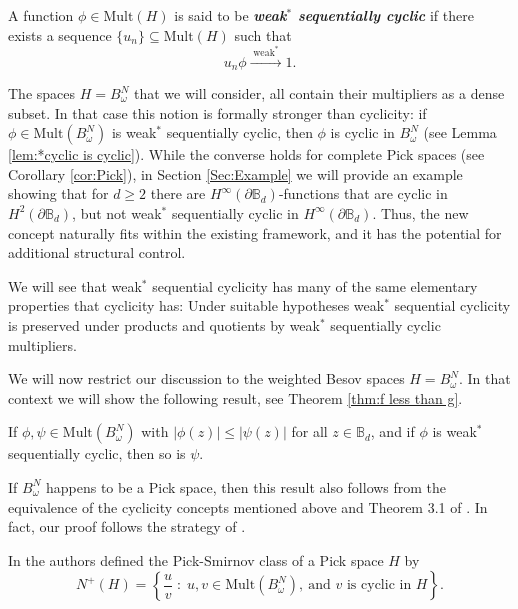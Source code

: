 \documentclass{article}
\numberwithin{equation}{section}
\newcommand{\dB}{\partial \mathbb B_d}
\newcommand{\Bd}{\mathbb B_d}
\begin{document}
\begin{defn}
A function $\phi \in \mathrm{Mult}(H)$ is said to be 
\textbf{\emph{weak$^\ast$ sequentially cyclic}} if there exists a sequence 
$\{u_n\} \subseteq  \mathrm{Mult}(H)$ such that
\[
u_n\phi \xrightarrow{\;\mathrm{weak}^\ast\;} 1.
\]
\end{defn}

The spaces $H=B^N_\omega$ that we will consider, all contain their multipliers as a dense subset. In that case this notion is formally stronger than  cyclicity: if $\phi \in \mathrm{Mult}(B^{N}_{\omega})$ is 
weak$^\ast$ sequentially cyclic, then $\phi$ is cyclic in 
$B^{N}_{\omega}$ (see Lemma \ref{lem:*cyclic is cyclic}). While the converse holds for complete Pick spaces (see Corollary \ref{cor:Pick}), 
in Section \ref{Sec:Example} we will provide an 
 example  showing that for $d\ge 2$ there are $H^\infty(\dB)$-functions that are cyclic in $H^2(\dB)$, but 
not  weak$^\ast$ sequentially cyclic in $H^\infty(\dB)$. Thus, the new concept naturally fits within the existing 
framework, and it has the potential for additional structural control.

We will see that weak$^\ast$ sequential cyclicity has many of the same elementary properties that cyclicity has: Under suitable 
hypotheses weak$^\ast$ sequential cyclicity is preserved under 
products and quotients by weak$^\ast$ sequentially cyclic multipliers.  

We will now restrict our discussion to the weighted Besov spaces  $H=B^N_\omega$. In that context  we will show the following result, see Theorem \ref{thm:f less than g}. 

\begin{thm} If $\phi, \psi \in \mathrm{Mult}(B^N_\omega)$ with $|\phi(z)|\le |\psi(z)|$ for all $z\in \Bd$, and if $\phi$ is weak$^\ast$ sequentially cyclic, then so is $\psi$.\end{thm} 
If $ B^N_\omega$ happens to be a Pick space, then this result also follows from the equivalence of the cyclicity concepts mentioned above and Theorem 3.1 of \cite{AlemanPerfektRichterSundbergSunkes2023}. In fact, our proof  follows the strategy of \cite{AlemanPerfektRichterSundbergSunkes2023}.


In  \cite{AlemanHartzMcCarthyRichter2017} the authors defined the Pick-Smirnov class of a Pick space $H$ by $$N^{+}(H)
=
\left\{
\frac{u}{v} \;:\; u, v \in \mathrm{Mult}(B^{N}_{\omega}),
\ \text{and } v \text{ is  cyclic in }H
\right\}.$$
\end{document}
